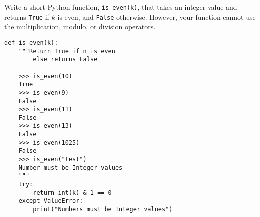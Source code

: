  \label{sssec:ex1_2}

Write a short Python function, \texttt{is\_even(k)}, that takes an integer value and returns \texttt{True} if $k$ is even, and \texttt{False} otherwise. However, your function cannot use the multiplication, modulo, or division operators.

\begin{lstlisting}[title=Exercise R-1.2]
def is_even(k):
    """Return True if n is even 
		else returns False

    >>> is_even(10)
    True
    >>> is_even(9)
    False
    >>> is_even(11)
    False
    >>> is_even(13)
    False
    >>> is_even(1025)
    False
    >>> is_even("test")
    Number must be Integer values
    """
    try:
        return int(k) & 1 == 0
    except ValueError:
        print("Numbers must be Integer values")
\end{lstlisting}